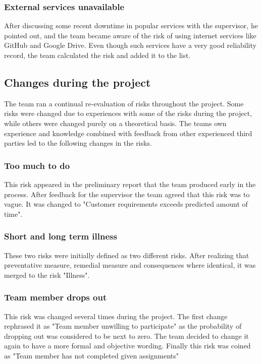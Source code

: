 \subsubsection{External services unavailable}
After discussing some recent downtime in popular services with the supervisor, he pointed out, and the team became aware of the risk of using internet services like GitHub and Google Drive. Even though such services have a very good reliability record, the team calculated the risk and added it to the list.

\subsection{Changes during the project}
The team ran a continual re-evaluation of risks throughout the project. Some risks were changed due to experiences with some of the risks during the project, while others were changed purely on a theoretical basis. The teams own experience and knowledge combined with feedback from other experienced third parties led to the following changes in the risks.

\subsubsection{Too much to do}
This risk appeared in the preliminary report that the team produced early in the process. After feedback for the supervisor the team agreed that this risk was to vague. It was changed to "Customer requirements exceeds predicted amount of time".

\subsubsection{Short and long term illness}
These two risks were initially defined as two different risks. After realizing that preventative measure, remedial measure and consequences where identical, it was merged to the risk "Illness".

\subsubsection{Team member drops out}
This risk was changed several times during the project. The first change rephrased it as "Team member unwilling to participate" as the probability of dropping out was considered to be next to zero. The team decided to change it again to have a more formal and objective wording. Finally this risk was coined as "Team member has not completed given assignments"

